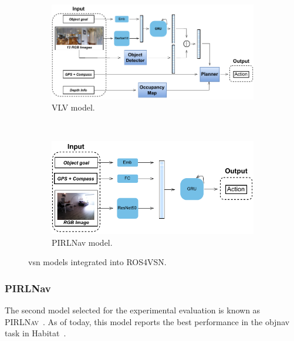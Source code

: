 \begin{figure}
    \centering
    \begin{subfigure}[b]{\textwidth}
        \includegraphics[width=\textwidth]{figures/ros4vsn/vlv_diagram}
        \caption{VLV model.}
        \label{fig:vlv_overview}
    \end{subfigure}
    ~
    \begin{subfigure}[b]{\textwidth}
        \includegraphics[width=\textwidth]{figures/ros4vsn/pirlnav_diagram}
        \caption{PIRLNav model.}
        \label{fig:pirlnav_overview}
    \end{subfigure}
    \caption{\acrshort{vsn} models integrated into ROS4VSN.}\label{fig:vsn_models_overview}
\end{figure}

\subsubsection{PIRLNav}
The second model selected for the experimental evaluation is known as \textsc{PIRLNav}~\cite{ramrakhya2023}.
As of today, this model reports the best performance in the \acrshort{objnav}~\cite{batra2020} task in Habitat~\cite{NEURIPS2021_021bbc7e}.


